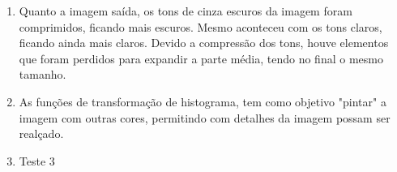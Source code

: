 \begin{question}

    \begin{enumerate}[label=\textbf{\alph*})]
		\item Quanto a imagem saída, os tons de cinza escuros da 
		imagem foram comprimidos, ficando mais escuros. Mesmo aconteceu com 
		os tons claros, ficando ainda mais claros. Devido a compressão 
		dos tons, houve elementos que foram perdidos para 
		expandir a parte média, tendo no final o mesmo tamanho.
  		\item As funções de transformação de histograma, tem como objetivo 
		"pintar" a imagem com outras cores, permitindo com detalhes da imagem 
		possam ser realçado.
    	\item Teste 3
	\end{enumerate}

\end{question}